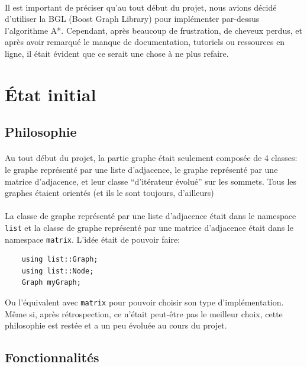 \documentclass[french]{article}
\begin{document}
\paragraph{} Il est important de préciser qu'au tout début du projet, nous
avions décidé d'utiliser la BGL (Boost Graph Library) pour implémenter
par-dessus l'algorithme A*. Cependant, après beaucoup de frustration, de
cheveux perdus, et après avoir remarqué le manque de documentation, tutoriels
ou ressources en ligne, il était évident que ce serait une chose à ne plus
refaire.

\section{État initial}

\subsection{Philosophie}

\paragraph{} Au tout début du projet, la partie graphe était seulement composée
de 4 classes: le graphe représenté par une liste d'adjacence, le graphe
représenté par une matrice d'adjacence, et leur classe ``d'itérateur évolué''
sur les sommets. Tous les graphes étaient orientés (et ils le sont toujours,
d'ailleurs)

\paragraph{} La classe de graphe représenté par une liste d'adjacence était
dans le namespace \texttt{list} et la classe de graphe représenté par une
matrice d'adjacence était dans le namespace \texttt{matrix}. L'idée était de
pouvoir faire:

\begin{verbatim}
	using list::Graph;
	using list::Node;
	Graph myGraph;
\end{verbatim}

Ou l'équivalent avec \texttt{matrix} pour pouvoir choisir son type
d'implémentation. Même si, après rétrospection, ce n'était peut-être pas le
meilleur choix, cette philosophie est restée et a un peu évoluée au cours du
projet.

\subsection{Fonctionnalités}
\end{document}
